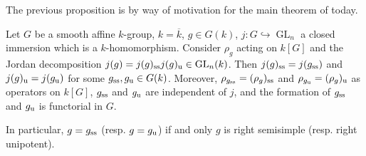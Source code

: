 \documentclass[10pt]{article}
\newcommand{\GL}{\operatorname{GL}}
\renewcommand{\(}{\left(}
\renewcommand{\)}{\right)}
\renewcommand{\bar}{\overline}
\newcommand{\into}{\hookrightarrow}
\numberwithin{thm}{subsection}
\begin{document}
The previous proposition is by way of motivation for the main theorem of today.
\begin{thm}\label{jordan}
Let $G$ be a smooth affine $k$-group, $k=\bar k$, $g\in G(k)$,
$j:G\into \GL_n$ a closed immersion which is a $k$-homomorphism.
Consider $\rho_g$ acting on $k[G]$
and the Jordan decomposition
$j(g)=j(g)_{\rm{ss}}j(g)_{\rm{u}}\in \GL_n(k)$.
Then $j(g)_{\rm{ss}}=j(g_{\rm{ss}})$ and $j(g)_{\rm{u}}=j(g_{\rm{u}})$
for some  $g_{\rm{ss}},g_{\rm{u}}\in G(k)$.
Moreover, $\rho_{g_{\rm{ss}}}=(\rho_g)_{\rm{ss}}$ and $\rho_{g_{\rm{u}}}=(\rho_g)_{\rm{u}}$ as operators on $k[G]$, 
$g_{\rm{ss}}$ and $g_{\rm{u}}$ are independent of $j$, and 
the formation of $g_{\rm{ss}}$ and $g_{\rm{u}}$ is functorial in $G$.

In particular, $g=g_{\rm{ss}}$ (resp. $g=g_{\rm{u}}$) if and only $g$ is right semisimple
(resp. right unipotent).
\end{thm}
\end{document}
